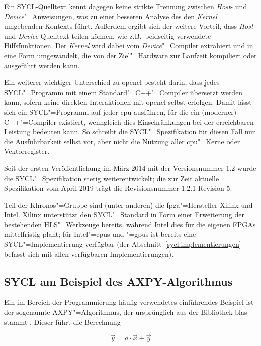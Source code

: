 Ein SYCL-Quelltext kennt dagegen keine strikte Trennung zwischen \textit{Host}-
und \textit{Device}"=Anweisungen, was zu einer besseren Analyse des den
\textit{Kernel} umgebenden Kontexts führt. Außerdem ergibt sich der weitere
Vorteil, dass \textit{Host} und \textit{Device} Quelltext teilen können, wie
z.B.\ beidseitig verwendete Hilfsfunktionen. Der \textit{Kernel} wird dabei vom
\textit{Device}"=Compiler extrahiert und in eine Form umgewandelt, die von der
Ziel"=Hardware zur Laufzeit kompiliert oder ausgeführt werden kann.
\cite[vgl][35]{sycl2019}

Ein weiterer wichtiger Unterschied zu \gls{opencl} besteht darin, dass
jedes SYCL"=Programm mit einem Standard"=C++"=Compiler übersetzt werden kann,
sofern keine direkten Interaktionen mit \gls{opencl} selbst erfolgen. Damit
lässt sich ein SYCL"=Programm auf jeder \gls{cpu} ausführen, für die ein
(moderner) C++"=Compiler existiert, wenngleich dies Einschränkungen bei der
erreichbaren Leistung bedeuten kann. So schreibt die SYCL"=Spezifikation für
diesen Fall nur die Ausführbarkeit selbst vor, aber nicht die Nutzung aller
\gls{cpu}"=Kerne oder Vektorregister. \cite[vgl.][15]{sycl2019}

Seit der ersten Veröffentlichung im März 2014 \cite[vgl.][]{khronos2014} mit der
Versionsnummer 1.2 wurde die SYCL"=Spezifikation stetig weiterentwickelt; die
zur Zeit aktuelle Spezifikation vom April 2019 trägt die Revisionsnummer 1.2.1
Revision 5. \cite[vgl.][1]{sycl2019}

Teil der Khronos"=Gruppe sind (unter anderen) die \gls{fpga}"=Hersteller Xilinx
und Intel. Xilinx unterstützt den SYCL"=Standard in Form einer Erweiterung der
bestehenden HLS"=Werkzeuge bereits, während Intel dies für die eigenen FPGAs
mittelfristig plant; für Intel"=\gls{cpu}s und "=\gls{gpu}s ist bereits eine
SYCL"=Implementierung verfügbar (der Abschnitt~\ref{sycl:implementierungen}
befasst sich mit allen verfügbaren Implementierungen).

\subsection{SYCL am Beispiel des AXPY-Algorithmus}
\label{sycl:ueberblick:axpy}

Ein im Bereich der Programmierung häufig verwendetes einführendes Beispiel
ist der sogenannte AXPY"=Algorithmus, der ursprünglich aus der Bibliothek
\gls{blas} stammt \cite[vgl.][]{lawson1979}. Dieser führt die Berechnung

\begin{equation}\label{sycl:ueberblick:axpy:formel}
    \vec{y} = a \cdot \vec{x} + \vec{y}
\end{equation}

